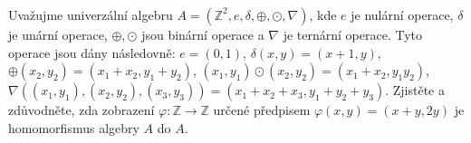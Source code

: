 \subsubsection{}
Uvažujme univerzální algebru 
$A=\left ( \mathbb{Z}^{2},e,\delta,\oplus ,\odot, \nabla \right )$, 
kde $e$ je nulární operace, $\delta$ je unární
operace, $\oplus, \odot$ jsou binární operace a $\nabla$ je ternární
operace. Tyto operace jsou dány následovně: $e=(0,1)$, $\delta(x,y)=(x+1,y)$,
$\oplus(x_{2},y_{2})=(x_{1} + x_{2}, y_{1}+y_{2})$, $(x_{1},y_{1}) \odot
(x_{2},y_{2})=(x_{1}+x_{2},y_{1}y_{2})$, $\nabla ((x_{1},y_{1}),
(x_{2},y_{2}), (x_{3},y_{3})) = (x_{1} + x_{2} + x_{3}, y_{1} + y_{2} + y_{3})$.
Zjistěte a zdůvodněte, zda zobrazení $\varphi : \mathbb{Z} \rightarrow
\mathbb{Z}$ určené předpisem $\varphi(x,y) = (x+y, 2y)$ je homomorfismus algebry
$A$ do $A$.
